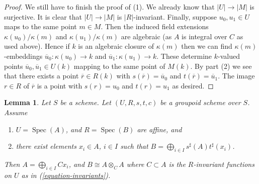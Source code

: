 \documentclass{amsart}
\theoremstyle{plain}
\newtheorem{lemma}[subsection]{Lemma}
\theoremstyle{definition}
\theoremstyle{remark}
\numberwithin{equation}{subsection}
\def\Spec{\mathop{\mathrm{Spec}}}
\begin{document}
\begin{proof}
\medskip\noindent
We still have to finish the proof of (1). We already know that
$|U| \to |M|$ is surjective. It is clear that $|U| \to |M|$ is
$|R|$-invariant. Finally, suppose $u_0, u_1 \in U$ maps to the same
point $m \in M$. Then the induced field extensions $\kappa(u_0)/\kappa(m)$
and $\kappa(u_1)/\kappa(m)$ are algebraic (as $A$ is integral over $C$
as used above). Hence if $k$ is an algebraic closure of $\kappa(m)$
then we can find $\kappa(m)$-embeddings $\overline{u}_0 : \kappa(u_0) \to k$
and $\overline{u}_1 : \kappa(u_1) \to k$. These determine $k$-valued
points $\overline{u}_0, \overline{u}_1 \in U(k)$ mapping to the same
point of $M(k)$. By part (2) we see that there exists a point
$\overline{r} \in R(k)$ with $s(\overline{r}) = \overline{u}_0$ and
$t(\overline{r}) = \overline{u}_1$. The image $r \in R$ of $\overline{r}$
is a point with $s(r) = u_0$ and $t(r) = u_1$ as desired.
\end{proof}


\begin{lemma}
\label{lemma-basis}
Let $S$ be a scheme.
Let $(U, R, s, t, c)$ be a groupoid scheme over $S$.
Assume
\begin{enumerate}
\item $U = \Spec(A)$, and $R = \Spec(B)$ are affine, and
\item there exist elements $x_i \in A$, $i \in I$ such that
$B = \bigoplus_{i \in I} s^\sharp(A)t^\sharp(x_i)$.
\end{enumerate}
Then $A = \bigoplus_{i\in I} Cx_i$, and $B \cong A \otimes_C A$
where $C \subset A$ is the $R$-invariant
functions on $U$ as in (\ref{equation-invariants}).
\end{lemma}
\end{document}
